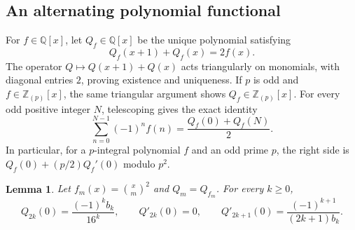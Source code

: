\documentclass[11pt,a4paper]{article}
\numberwithin{equation}{section}
\newtheorem{lemma}[theorem]{Lemma}
\theoremstyle{remark}
\begin{document}
\subsection{An alternating polynomial functional}

For $f\in\mathbb Q[x]$, let $Q_f\in\mathbb Q[x]$ be the unique
polynomial satisfying
\[
 Q_f(x+1)+Q_f(x)=2f(x).
\]
The operator $Q\mapsto Q(x+1)+Q(x)$ acts triangularly on monomials,
with diagonal entries $2$, proving existence and uniqueness. If
$p$ is odd and $f\in\mathbb Z_{(p)}[x]$, the same triangular
argument shows $Q_f\in\mathbb Z_{(p)}[x]$. For every odd positive
integer $N$, telescoping gives the exact identity
\begin{equation}\label{eq:alternating-functional}
 \sum_{n=0}^{N-1}(-1)^n f(n)=\frac{Q_f(0)+Q_f(N)}2.
\end{equation}
In particular, for a $p$-integral polynomial $f$ and an odd prime $p$,
the right side is
$Q_f(0)+(p/2)Q_f'(0)$ modulo $p^2$.

\begin{lemma}\label{lem:alternating-binomial-functional}
Let $f_m(x)=\binom xm^2$ and $Q_m=Q_{f_m}$. For every $k\ge0$,
\[
 Q_{2k}(0)=\frac{(-1)^k b_k}{16^k},\qquad
 Q'_{2k}(0)=0,\qquad
 Q'_{2k+1}(0)=\frac{(-1)^{k+1}}{(2k+1)b_k}.
\]
\end{lemma}
\end{document}
